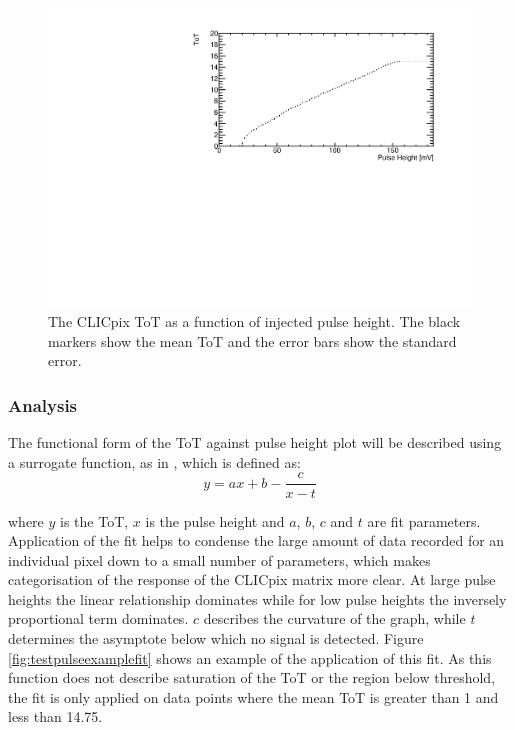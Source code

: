 \begin{figure}[h!]
\centering
\includegraphics[width=1.0\textwidth]{CLICdpVertex/Plots/TestPulseCalibration/Fits/Set9/ToT_PulseHeight_Set_9_ChipID_001ec0db94b1_Pixel_x0_y0_NoFit.pdf}
\caption[The CLICpix ToT as a function of injected pulse height.  The black markers show the mean ToT and the error bars show the standard error.]{The CLICpix ToT as a function of injected pulse height.  The black markers show the mean ToT and the error bars show the standard error.}
\label{fig:testpulseexamplenofit}
\end{figure}


\subsubsection{Analysis}
The functional form of the ToT against pulse height plot will be described using a surrogate function, as in \cite{AlipourTehrani:2054922}, which is defined as:  
\begin{equation}
y  = ax + b  - \frac{c}{x-t}
\end{equation}

\noindent where $y$ is the ToT, $x$ is the pulse height and $a$, $b$, $c$ and $t$ are fit parameters.  Application of the fit helps to condense the large amount of data recorded for an individual pixel down to a small number of parameters, which makes categorisation of the response of the CLICpix matrix more clear.  At large pulse heights the linear relationship dominates while for low pulse heights the inversely proportional term dominates.  $c$ describes the curvature of the graph, while $t$ determines the asymptote below which no signal is detected.  Figure \ref{fig:testpulseexamplefit} shows an example of the application of this fit.  As this function does not describe saturation of the ToT or the region below threshold, the fit is only applied on data points where the mean ToT is greater than 1 and less than 14.75.  

